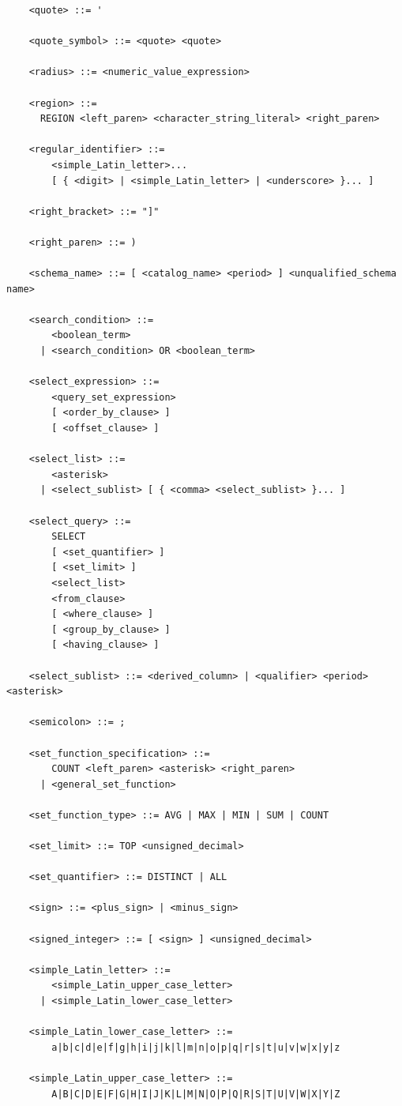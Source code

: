 \documentclass[11pt,a4paper]{ivoa}
\begin{document}
\begin{verbatim}
    <quote> ::= '

    <quote_symbol> ::= <quote> <quote>

    <radius> ::= <numeric_value_expression>

    <region> ::=
      REGION <left_paren> <character_string_literal> <right_paren>

    <regular_identifier> ::=
        <simple_Latin_letter>...
        [ { <digit> | <simple_Latin_letter> | <underscore> }... ]

    <right_bracket> ::= "]"

    <right_paren> ::= )

    <schema_name> ::= [ <catalog_name> <period> ] <unqualified_schema name>

    <search_condition> ::=
        <boolean_term>
      | <search_condition> OR <boolean_term>

    <select_expression> ::=
        <query_set_expression>
        [ <order_by_clause> ]
        [ <offset_clause> ]
    
    <select_list> ::=
        <asterisk>
      | <select_sublist> [ { <comma> <select_sublist> }... ]

    <select_query> ::=
        SELECT
        [ <set_quantifier> ]
        [ <set_limit> ]
        <select_list>
        <from_clause>
        [ <where_clause> ]
        [ <group_by_clause> ]
        [ <having_clause> ]

    <select_sublist> ::= <derived_column> | <qualifier> <period> <asterisk>

    <semicolon> ::= ;

    <set_function_specification> ::=
        COUNT <left_paren> <asterisk> <right_paren>
      | <general_set_function>

    <set_function_type> ::= AVG | MAX | MIN | SUM | COUNT

    <set_limit> ::= TOP <unsigned_decimal>

    <set_quantifier> ::= DISTINCT | ALL

    <sign> ::= <plus_sign> | <minus_sign>

    <signed_integer> ::= [ <sign> ] <unsigned_decimal>

    <simple_Latin_letter> ::=
        <simple_Latin_upper_case_letter>
      | <simple_Latin_lower_case_letter>

    <simple_Latin_lower_case_letter> ::=
        a|b|c|d|e|f|g|h|i|j|k|l|m|n|o|p|q|r|s|t|u|v|w|x|y|z

    <simple_Latin_upper_case_letter> ::=
        A|B|C|D|E|F|G|H|I|J|K|L|M|N|O|P|Q|R|S|T|U|V|W|X|Y|Z


\end{verbatim}
\end{document}
